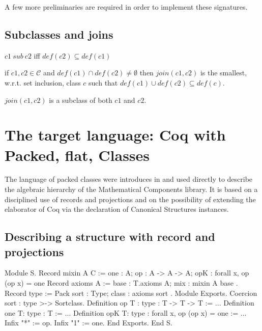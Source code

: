 \documentclass[a4paper,UKenglish,cleveref, autoref]{lipics-v2019}
\newcommand{\C}{\ensuremath{\mathcal{C}}}
\newcommand{\class}{class}
\newcommand{\cdef}{\ensuremath{def}}
\newcommand{\issubclass}{\ensuremath{sub}}
\newcommand{\subclass}{subclass}
\newcommand{\join}{\ensuremath{join}}
\theoremstyle{implem}
\theoremstyle{implem}
\theoremstyle{axiom}
\theoremstyle{abscommand}
\theoremstyle{command}
\begin{document}
A few more preliminaries are required in order to implement these signatures.

\subsection{Subclasses and joins}

\begin{definition}[\issubclass{} \(\in \C{}\times\C{}\), \subclass{}]\label{def:subclass}
  \(c1~\issubclass{}~c2\) iff \(\cdef{}(c2) \subseteq \cdef{}(c1)\)
  \end{definition}

\begin{definition}[\(\join{} \in \C{}\times\C{} \to \C{}\)]\label{def:join}
if \(c1, c2 \in \C{}\) and \(\cdef{}(c1) \cap \cdef{}(c2) \neq \emptyset\)
then \(\join{}(c1,c2)\) is the smallest, w.r.t. set inclusion, \class{} \(c\) such that
\(\cdef{}(c1) \cup \cdef{}(c2) \subseteq \cdef{}(c)\).
\end{definition}

\begin{remark}[]
\(\join{}(c1,c2)\) is a \subclass{} of both \(c1\) and \(c2\).
\end{remark}

\section{The target language: Coq with Packed, flat, Classes}
\label{sec:target-lang}

The language of packed classes were introduces in
\cite{DBLP:conf/tphol/GarillotGMR09} and used directly to describe the
algebraic hierarchy of the Mathematical Components library.
It is based on a disciplined use of records and projections and
on the possibility of extending the elaborator of Coq
via the declaration of Canonical Structures instances.

\subsection{Describing a structure with record and projections}

\begin{coqcode}
Module S.
  Record mixin A C := {
    one : A;
    op : A -> A -> A;
    opK : forall x, op (op x) = one
  }
  Record axioms A := {
    base : T.axioms A;
    mix  : mixin A base
  }.
  Record type := Pack {
    sort : Type;
    class : axioms sort
  }.
  Module Exports.
    Coercion sort : type >-> Sortclass.
    Definition op {T : type} : T -> T -> T := ...
    Definition one {T:  type} : T := ...
    Definition opK {T:  type} : forall x, op (op x) = one := ...
    Infix "*" := op.
    Infix "1" := one.
  End Exports.
End S.
\end{coqcode}
\end{document}
